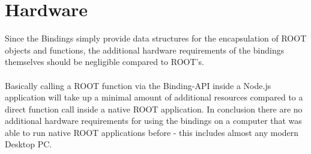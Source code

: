 \section{Hardware}

Since the Bindings simply provide data structures for the encapsulation of ROOT objects and functions, the additional hardware requirements of the bindings themselves 
should be negligible compared to ROOT's.\\ \\
Basically calling a ROOT function via the Binding-API inside a Node.js application will take up a minimal amount of additional resources compared to a direct function call inside a native ROOT application.
In conclusion there are no additional hardware requirements for using the bindings on a computer that was able to run native ROOT applications before - this includes almost any modern Desktop PC.
